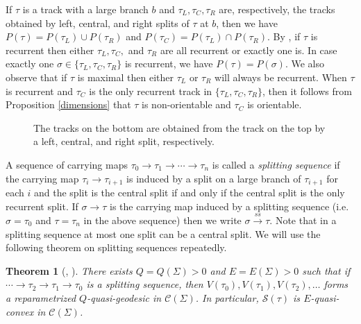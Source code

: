 \documentclass[11pt]{article}
\newtheorem{thm}{Theorem}[section]
\theoremstyle{remark}
\def\S{{\mathcal S}}
\def\C{{\mathcal C}}
\def\ss{{\overset{ss}\longrightarrow}}
\begin{document}
If $\tau$ is a track with a
large branch $b$ and $\tau_L,\tau_C, \tau_R$ are, respectively, the tracks
obtained by left, central,
and right splits of $\tau$ at $b$, then we have $P(\tau)= P(\tau_L)\cup P(\tau_R)$
and $P(\tau_C)=P(\tau_L)\cap P(\tau_R)$.
By \cite[Lemma 2.1.3]{Penner}, if $\tau$ is recurrent then either $\tau_L,\tau_C,$
and $\tau_R$ are all recurrent or exactly one is. In case exactly one
$\sigma \in \{\tau_L,\tau_C,\tau_R\}$ is recurrent, we have $P(\tau)=P(\sigma)$.
We also observe that if $\tau$ is maximal then either $\tau_L$ or $\tau_R$ will
always be recurrent.
When $\tau$ is recurrent and $\tau_C$ is the only recurrent track in
$\{\tau_L,\tau_C,\tau_R\}$, then it follows from Proposition \ref{dimensions} that
$\tau$ is non-orientable and $\tau_C$ is orientable.

\begin{figure}[h]

  \centering

  \def\svgwidth{0.9\textwidth}
  

  \caption{The tracks on the bottom are obtained from the track on the top by a left,
    central, and right split, respectively.}
  \label{split}
\end{figure}

A sequence of carrying maps $\tau_0 \to \tau_1 \to \cdots \to \tau_n$ is called a
\emph{splitting sequence} if the carrying map $\tau_i \to \tau_{i+1}$ is induced
by a split on a large branch of $\tau_{i+1}$ for each $i$ and the split is the central split if and only if the central split is the only recurrent split.
If $\sigma \to \tau$ is the carrying map induced by a splitting sequence
(i.e. $\sigma=\tau_0$ and $\tau=\tau_n$ in the above sequence) then
we write $\sigma \ss \tau$. Note that in a splitting sequence at most one split can be a central split.
We will use the following theorem on splitting sequences repeatedly.

\begin{thm}[{\cite[Theorem 1.2]{MMQuasiconv}, \cite[Corollary 2.6]{HamenstadtTT}}]
  \label{quasigeodesics}
  There exists $Q=Q(\Sigma)>0$ and $E =E(\Sigma) >0$ such that if $\cdots \to \tau_2 \to \tau_1 \to \tau_0$ is a
  splitting sequence, then $V(\tau_0),V(\tau_1),V(\tau_2),\ldots$ forms a
  reparametrized $Q$-quasi-geodesic in $\C(\Sigma)$. In particular, $\S(\tau)$
  is $E$-quasi-convex in $\C(\Sigma)$.
\end{thm}
\end{document}
